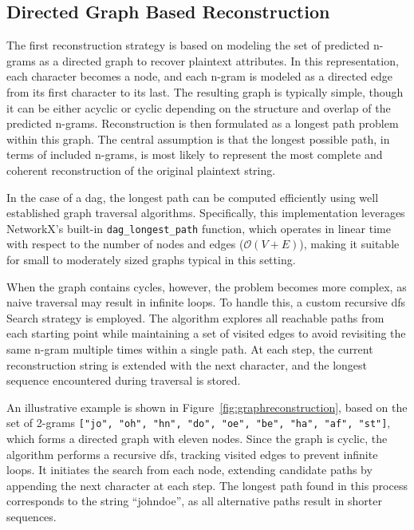 \subsection{Directed Graph Based Reconstruction} \label{sec:graphrecon}

The first reconstruction strategy is based on modeling the set of predicted n-grams as a directed graph to recover plaintext attributes.
In this representation, each character becomes a node, and each n-gram is modeled as a directed edge from its first character to its last.
The resulting graph is typically simple, though it can be either acyclic or cyclic depending on the structure and overlap of the predicted n-grams.
Reconstruction is then formulated as a longest path problem within this graph.
The central assumption is that the longest possible path, in terms of included n-grams, is most likely to represent the most complete and coherent reconstruction of the original plaintext string.

In the case of a \ac{dag}, the longest path can be computed efficiently using well established graph traversal algorithms.
Specifically, this implementation leverages NetworkX’s built-in \texttt{dag\_longest\_path} function, which operates in linear time with respect to the number of nodes and edges (\( \mathcal{O}(V + E) \)), making it suitable for small to moderately sized graphs typical in this setting.


When the graph contains cycles, however, the problem becomes more complex, as naive traversal may result in infinite loops.
To handle this, a custom recursive \ac{dfs} Search strategy is employed.
The algorithm explores all reachable paths from each starting point while maintaining a set of visited edges to avoid revisiting the same n-gram multiple times within a single path.
At each step, the current reconstruction string is extended with the next character, and the longest sequence encountered during traversal is stored.

An illustrative example is shown in Figure~\ref{fig:graphreconstruction}, based on the set of 2-grams \texttt{["jo", "oh", "hn", "do", "oe", "be", "ha", "af", "st"]}, which forms a directed graph with eleven nodes.
Since the graph is cyclic, the algorithm performs a recursive \ac{dfs}, tracking visited edges to prevent infinite loops.
It initiates the search from each node, extending candidate paths by appending the next character at each step.
The longest path found in this process corresponds to the string \enquote{johndoe}, as all alternative paths result in shorter sequences.

